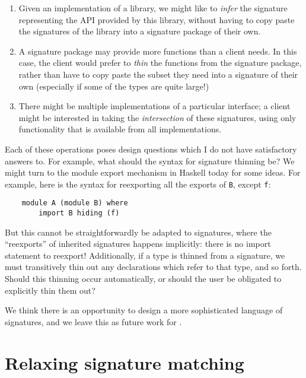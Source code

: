 \begin{enumerate}

    \item Given an implementation of a library, we might like to \emph{infer}
    the signature representing the API provided by this library,
    without having to copy paste the signatures of the library into a
    signature package of their own.

    \item A signature package may provide more functions than a client
    needs.  In this case, the client would prefer to \emph{thin} the
    functions from the signature package, rather than have to copy paste
    the subset they need into a signature of their own (especially if
    some of the types are quite large!)

    \item There might be multiple implementations of a particular
    interface; a client might be interested in taking the
    \emph{intersection} of these signatures, using only functionality
    that is available from all implementations.

\end{enumerate}
%
Each of these operations poses design questions which I do not have
satisfactory answers to.  For example, what should the syntax for signature
thinning be?  We might turn to the module export mechanism in Haskell today
for some ideas.  For example, here is the syntax for reexporting all the
exports of \verb|B|, except \verb|f|:

\begin{lstlisting}
    module A (module B) where
        import B hiding (f)
\end{lstlisting}
%
But this cannot be straightforwardly be adapted to signatures, where the
``reexports'' of inherited signatures happens implicitly: there is no
import statement to reexport!  Additionally, if a type is thinned from a
signature, we must transitively thin out any declarations which refer to
that type, and so forth.  Should this thinning occur automatically, or
should the user be obligated to explicitly thin them out?

We think there is an opportunity to design a more sophisticated language
of signatures, and we leave this as future work for \Backpack{}.

\label{sec:relaxed-matching}
\section{Relaxing signature matching}

